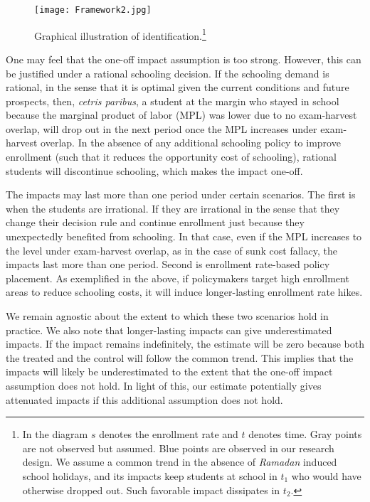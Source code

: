 \documentclass[12pt,letterpaper]{article}
\newcommand{\0}{\ensuremath{\mbox{\boldmath $0$}}}
\begin{document}
\begin{figure}[h!]
\centering
\texttt{[image: Framework2.jpg]}\\
\caption{Graphical illustration of identification.\footnote{In the diagram $s$ denotes the enrollment rate and $t$ denotes time. Gray points are not observed but assumed. Blue points are observed in our research design. We assume a common trend in the absence of \textit{Ramadan} induced school holidays, and its impacts keep students at school in $t_{1}$ who would have otherwise dropped out. Such favorable impact dissipates in $t_{2}$.}}
\label{ididea}
\end{figure}



One may feel that the one-off impact assumption is too strong. However, this can be justified under a rational schooling decision. If the schooling demand is rational, in the sense that it is optimal given the current conditions and future prospects, then, \textit{cetris paribus}, a student at the margin who stayed in school because the marginal product of labor (MPL) was lower due to no exam-harvest overlap, will drop out in the next period once the MPL increases under exam-harvest overlap. In the absence of any additional schooling policy to improve enrollment (such that it reduces the opportunity cost of schooling), rational students will discontinue schooling, which makes the impact one-off. 

The impacts may last more than one period under certain scenarios. The first is when the students are irrational. If they are irrational in the sense that they change their decision rule and continue enrollment just because they unexpectedly benefited from schooling. In that case, even if the MPL increases to the level under exam-harvest overlap, as in the case of sunk cost fallacy, the impacts last more than one period. Second is enrollment rate-based policy placement. As exemplified in the above, if policymakers target high enrollment areas to reduce schooling costs, it will induce longer-lasting enrollment rate hikes. 

We remain agnostic about the extent to which these two scenarios hold in practice. We also note that longer-lasting impacts can give underestimated impacts. If the impact remains indefinitely, the estimate will be zero because both the treated and the control will follow the common trend. This implies that the impacts will likely be underestimated to the extent that the one-off impact assumption does not hold. In light of this, our estimate potentially gives attenuated impacts if this additional assumption does not hold.
\end{document}
